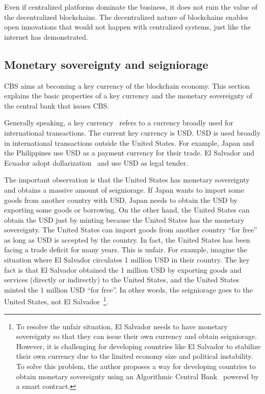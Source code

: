 \documentclass[dvipdfmx,a4paper]{article}
\begin{document}
Even if centralized platforms dominate the business, it does not ruin the value of the decentralized blockchains. The decentralized nature of blockchains enables open innovations that would not happen with centralized systems, just like the internet has demonstrated.


\subsection{Monetary sovereignty and seigniorage}

CBS aims at becoming a key currency of the blockchain economy. This section explains the basic properties of a key currency and the monetary sovereignty of the central bank that issues CBS.

Generally speaking, a key currency~\cite{robert2004international} refers to a currency broadly used for international transactions. The current key currency is USD. USD is used broadly in international transactions outside the United States. For example, Japan and the Philippines use USD as a payment currency for their trade. El Salvador and Ecuador adopt dollarization~\cite{calvo2002dollarization,selgin2005currency} and use USD as legal tender.

The important observation is that the United States has monetary sovereignty and obtains a massive amount of seigniorage. If Japan wants to import some goods from another country with USD, Japan needs to obtain the USD by exporting some goods or borrowing. On the other hand, the United States can obtain the USD just by minting because the United States has the monetary sovereignty. The United States can import goods from another country ``for free'' as long as USD is accepted by the country. In fact, the United States has been facing a trade deficit for many years. This is unfair. For example, imagine the situation where El Salvador circulates 1 million USD in their country. The key fact is that El Salvador obtained the 1 million USD by exporting goods and services (directly or indirectly) to the United States, and the United States minted the 1 million USD ``for free''. In other words, the seigniorage goes to the United States, not El Salvador~\footnote{To resolve the unfair situation, El Salvador needs to have monetary sovereignty so that they can issue their own currency and obtain seigniorage. However, it is challenging for developing countries like El Salvador to stabilize their own currency due to the limited economy size and political instability. To solve this problem, the author proposes a way for developing countries to obtain monetary sovereignty using an Algorithmic Central Bank~\cite{johnlawcoinacb} powered by a smart contract.}.
\end{document}
